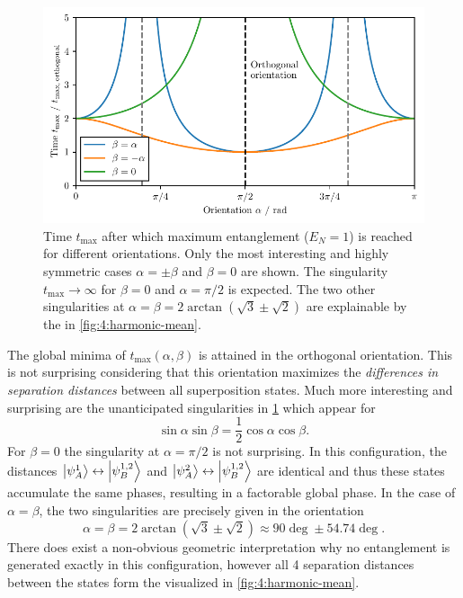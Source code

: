 \begin{figure}[!htbp]
  \centering
  \includegraphics[width=\textwidth]{./../figures/ideal-entanglement/t-max-orientation.pdf}
  \caption{Time $t_\mathrm{max}$ after which maximum entanglement ($E_N = 1$) is reached for different orientations. Only the most interesting and highly symmetric cases $\alpha=\pm\beta$ and $\beta=0$ are shown. The singularity $t_\mathrm{max} \rightarrow \infty$ for $\beta = 0$ and $\alpha = \pi/2$ is expected. The two other singularities at $\alpha = \beta = 2 \arctan(\sqrt{3} \pm \sqrt{2})$ are explainable by the  in \cref{fig:4:harmonic-mean}.}
  \label{fig:4:t-max-orientation}
\end{figure}
The global minima of $t_\mathrm{max}(\alpha,\beta)$ is attained in the orthogonal orientation. This is not surprising considering that this orientation maximizes the \textit{differences in separation distances} between all superposition states.
Much more interesting and surprising are the unanticipated singularities in \cref{fig:4:t-max-orientation} which appear for 
\begin{equation}
  \sin\alpha\sin\beta=\frac{1}{2}\cos\alpha\cos\beta .
\end{equation}
For $\beta=0$ the singularity at $\alpha=\pi/2$ is not surprising. In this configuration, the distances $\ket{\psi^1_A}\leftrightarrow\ket{\psi^{1,2}_B}$ and $\ket{\psi^2_A}\leftrightarrow\ket{\psi^{1,2}_B}$ are identical and thus these states accumulate the same phases, resulting in a factorable global phase.
In the case of $\alpha=\beta$, the two singularities are precisely given in the orientation
\begin{equation}
  \alpha=\beta=2 \arctan(\sqrt{3}\pm\sqrt{2})\approx 90\deg \pm 54.74\deg .
\end{equation}
There does exist a non-obvious geometric interpretation why no entanglement is generated exactly in this configuration, however all 4 separation distances between the states form the  visualized in \cref{fig:4:harmonic-mean}.
